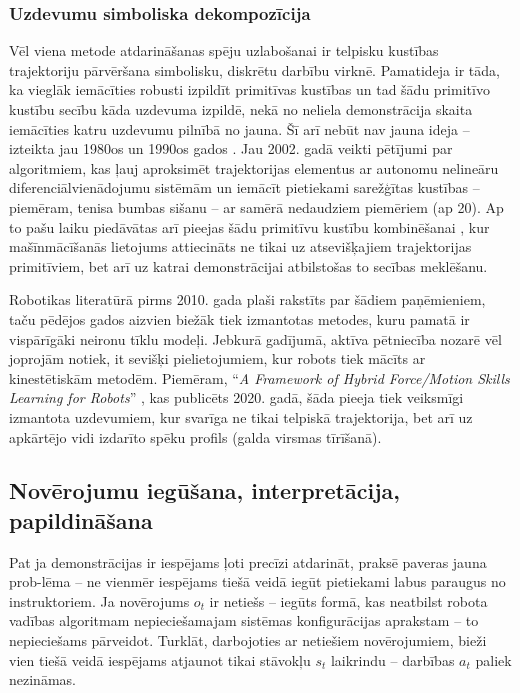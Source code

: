 \documentclass[12pt, a4paper]{article}
\numberwithin{equation}{section} %
\begin{document}
\subsubsection{Uzdevumu simboliska dekompozīcija}

Vēl viena metode atdarināšanas spēju uzlabošanai ir telpisku kustības trajektoriju pārvēršana simbolisku, diskrētu darbību virknē. Pamatideja ir tāda, ka vieglāk iemācīties robusti izpildīt primitīvas kustības un tad šādu primitīvo kustību secību kāda uzdevuma izpildē, nekā no neliela demonstrācija skaita iemācīties katru uzdevumu pilnībā no jauna. Šī arī nebūt nav jauna ideja -- izteikta jau 1980os un 1990os gados \cite{muench1994robot}. Jau 2002. gadā veikti pētījumi par algoritmiem, kas ļauj aproksimēt trajektorijas elementus ar autonomu nelineāru diferenciālvienādojumu sistēmām \cite{ijspeert2002movement} un iemācīt pietiekami sarežģītas kustības -- piemēram, tenisa bumbas sišanu -- ar samērā nedaudziem piemēriem (ap 20). Ap to pašu laiku piedāvātas arī pieejas šādu primitīvu kustību kombinēšanai \cite{schaal2003computational}, kur mašīnmācīšanās lietojums attiecināts ne tikai uz atsevišķajiem trajektorijas primitīviem, bet arī uz katrai demonstrācijai atbilstošas to secības meklēšanu.

Robotikas literatūrā pirms 2010. gada \cite{billard2008handbook} plaši rakstīts par šādiem paņēmieniem, taču pēdējos gados aizvien biežāk tiek izmantotas metodes, kuru pamatā ir vispārīgāki neironu tīklu modeļi. Jebkurā gadījumā, aktīva pētniecība nozarē vēl joprojām notiek, it sevišķi pielietojumiem, kur robots tiek mācīts ar kinestētiskām metodēm. Piemēram, ``\textit{A Framework of Hybrid Force/Motion Skills Learning for Robots}'' \cite{wang2020framework}, kas publicēts 2020. gadā, šāda pieeja tiek veiksmīgi izmantota uzdevumiem, kur svarīga ne tikai telpiskā trajektorija, bet arī uz apkārtējo vidi izdarīto spēku profils (galda virsmas tīrīšanā).

\subsection{Novērojumu iegūšana, interpretācija, papildināšana}

Pat ja demonstrācijas ir iespējams ļoti precīzi atdarināt, praksē paveras jauna prob-lēma -- ne vienmēr iespējams tiešā veidā iegūt pietiekami labus paraugus no instruktoriem. Ja novērojums $o_t$ ir netiešs -- iegūts formā, kas neatbilst robota vadības algoritmam nepieciešamajam sistēmas konfigurācijas aprakstam -- to nepieciešams pārveidot. Turklāt, darbojoties ar netiešiem novērojumiem, bieži vien tiešā veidā iespējams atjaunot tikai stāvokļu $s_t$ laikrindu -- darbības $a_t$ paliek nezināmas.
\end{document}

